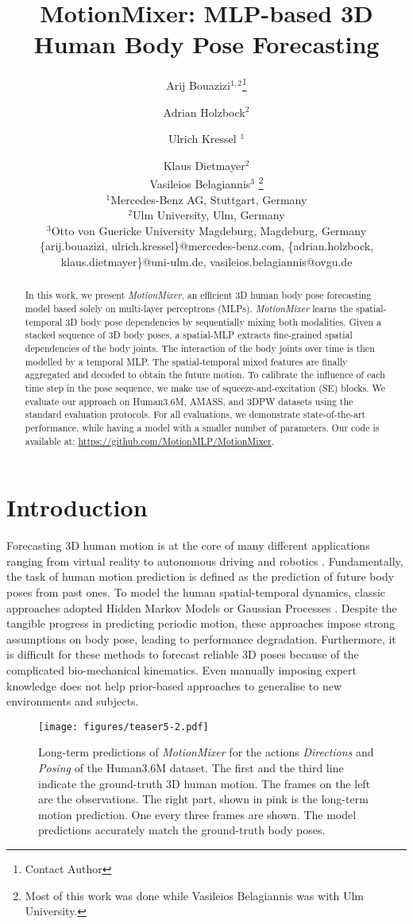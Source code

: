\documentclass{article}
\title{MotionMixer: MLP-based 3D Human Body Pose Forecasting}
\author{
Arij Bouazizi$^{1,2}$\footnote{Contact Author}\and
Adrian Holzbock$^2$\and
Ulrich Kressel $^{1}$\and
Klaus Dietmayer$^2$\And
\\ Vasileios Belagiannis$^3$ \footnote{Most of this work was done while Vasileios Belagiannis was with Ulm University.} \\
\affiliations
$^1$Mercedes-Benz AG, Stuttgart, Germany\\
$^2$Ulm University, Ulm, Germany\\
$^3$Otto von Guericke University Magdeburg, Magdeburg, Germany\\
\emails
\{arij.bouazizi, ulrich.kressel\}@mercedes-benz.com,
\{adrian.holzbock, klaus.dietmayer\}@uni-ulm.de,
vasileios.belagiannis@ovgu.de
}
\begin{document}
\maketitle

\begin{abstract}
In this work, we present \textit{MotionMixer}, an efficient 3D human body pose forecasting model based solely on multi-layer perceptrons (MLPs). \textit{MotionMixer} learns the spatial-temporal 3D body pose dependencies by sequentially mixing both modalities. Given a stacked sequence of 3D body poses, a spatial-MLP extracts fine-grained spatial dependencies of the body joints. The interaction of the body joints over time is then modelled by a temporal MLP. The spatial-temporal mixed features are finally aggregated and decoded to obtain the future motion. To calibrate the influence of each time step in the pose sequence, we  make use of squeeze-and-excitation (SE) blocks. We evaluate our approach on Human3.6M, AMASS, and 3DPW datasets using the standard evaluation protocols. For all evaluations, we demonstrate state-of-the-art performance, while having a model with a smaller number of parameters.  Our code is available at: \url{https://github.com/MotionMLP/MotionMixer}.
\end{abstract}


\section{Introduction}
Forecasting 3D human motion is at the core of many different applications ranging from virtual reality to autonomous driving \cite {wiederer2020traffic} and robotics \cite{gui2018teaching}. Fundamentally, the task of human motion prediction is defined as the prediction of future body poses from past ones. To model the human spatial-temporal dynamics, classic approaches adopted Hidden Markov Models \cite{kulic2012incremental} or Gaussian Processes \cite{wang2007gaussian}. Despite the tangible progress in predicting periodic motion, these approaches impose strong assumptions on body pose, leading to performance degradation. Furthermore, it is difficult for these methods to forecast reliable 3D poses because of  the complicated bio-mechanical kinematics. Even manually imposing expert knowledge does not help prior-based approaches to generalise to new environments and subjects.

\begin{figure} [ht!]
    \centering
    \texttt{[image: figures/teaser5-2.pdf]} 
    \caption{Long-term predictions of \textit{MotionMixer} for the actions \textit{Directions} and \textit{Posing}  of the Human3.6M dataset. The first and the third line indicate the ground-truth 3D human motion. The frames on the left are the observations. The right part, shown in pink is the long-term motion prediction. One every three frames are shown. The model predictions accurately match the ground-truth body poses.}
    \label{fig:teaser}
\end{figure}
\end{document}
